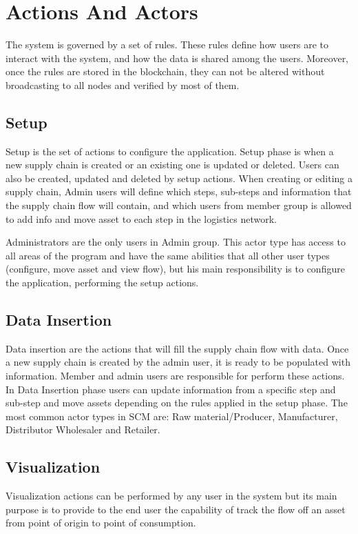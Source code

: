 \section{Actions And Actors}\label{sec:actionsAndActors}

The system is governed by a set of rules. These rules define how users are to interact with the system, and how the data is shared among the users. Moreover, once the rules are stored in the blockchain, they can not be altered without broadcasting to all nodes and verified by most of them.

\subsection{Setup}\label{sec:Setup}
Setup is the set of actions to configure the application. Setup phase is when a new supply chain is created or an existing one is updated or deleted. Users can also be created, updated and deleted by setup actions. When creating or editing a supply chain, Admin users will define which steps, sub-steps and information that the supply chain flow will contain, and which users from member group is allowed to add info and move asset to each step in the logistics network.

Administrators are the only users in Admin group. This actor type has access to all areas of the program and have the same abilities that all other user types (configure, move asset and view flow), but his main responsibility is to configure the application, performing the setup actions. 



\subsection{Data Insertion}\label{sec:DataInsertion}

Data insertion are the actions that will fill the supply chain flow with data. Once a new supply chain is created by the admin user, it is ready to be populated with information. Member and admin users are responsible for perform these actions. In Data Insertion phase users can update information from a specific step and sub-step and move assets depending on the rules applied in the setup phase. The most common actor types in SCM are: Raw material/Producer, Manufacturer, Distributor Wholesaler and Retailer.


\subsection{Visualization}\label{sec:Visualization}

Visualization actions can be performed by any user in the system but its main purpose is to provide to the end user the capability of track the flow off an asset from point of origin to point of consumption.